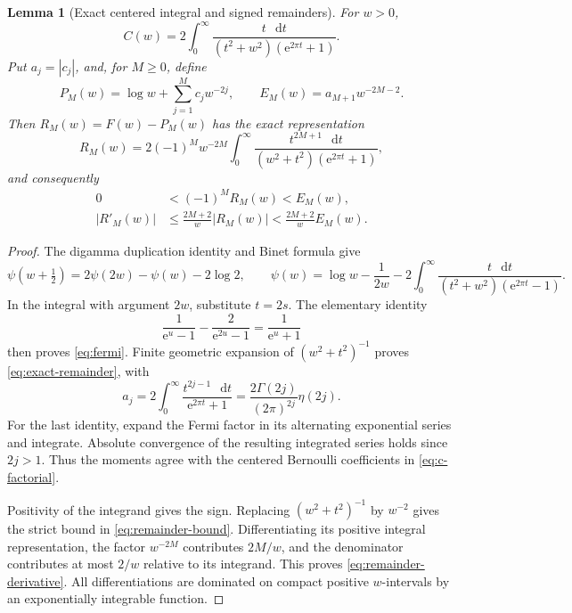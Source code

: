 \documentclass[11pt,a4paper]{article}
\newtheorem{lemma}[theorem]{Lemma}
\theoremstyle{definition}
\numberwithin{equation}{section}
\newcommand{\dd}{\mathop{}\!\mathrm{d}}
\newcommand{\ee}{\mathrm{e}}
\begin{document}
\begin{lemma}[Exact centered integral and signed remainders]
\label{lem:fermi}
For $w>0$,
\begin{equation}
 C(w)=2\int_0^\infty
       \frac{t\,\dd t}{(t^2+w^2)(\ee^{2\pi t}+1)}.
 \label{eq:fermi}
\end{equation}
Put $a_j=|c_j|$, and, for $M\ge0$, define
\begin{equation}
 P_M(w)=\log w+\sum_{j=1}^M c_jw^{-2j},\qquad
 E_M(w)=a_{M+1}w^{-2M-2}.
 \label{eq:PM}
\end{equation}
Then $R_M(w)=F(w)-P_M(w)$ has the exact representation
\begin{equation}
 R_M(w)=2(-1)^Mw^{-2M}
  \int_0^\infty\frac{t^{2M+1}\,\dd t}
       {(w^2+t^2)(\ee^{2\pi t}+1)},
 \label{eq:exact-remainder}
\end{equation}
and consequently
\begin{align}
 0&<(-1)^MR_M(w)<E_M(w),\label{eq:remainder-bound}\\
 |R'_M(w)|&\le\frac{2M+2}{w}|R_M(w)|
             <\frac{2M+2}{w}E_M(w).\label{eq:remainder-derivative}
\end{align}
\end{lemma}
\begin{proof}
The digamma duplication identity and Binet formula \cite[\S\S5.5, 5.9]{dlmf} give
\[
 \psi(w+\tfrac12)=2\psi(2w)-\psi(w)-2\log2,
 \qquad
 \psi(w)=\log w-\frac1{2w}
 -2\int_0^\infty\frac{t\,\dd t}{(t^2+w^2)(\ee^{2\pi t}-1)}.
\]
In the integral with argument $2w$, substitute $t=2s$. The elementary identity
\[
 \frac1{\ee^u-1}-\frac2{\ee^{2u}-1}=\frac1{\ee^u+1}
\]
then proves \eqref{eq:fermi}. Finite geometric expansion of $(w^2+t^2)^{-1}$ proves \eqref{eq:exact-remainder}, with
\begin{equation}
 a_j=2\int_0^\infty\frac{t^{2j-1}\,\dd t}{\ee^{2\pi t}+1}
     =\frac{2\Gamma(2j)}{(2\pi)^{2j}}\eta(2j).
 \label{eq:moment}
\end{equation}
For the last identity, expand the Fermi factor in its alternating exponential series and integrate. Absolute convergence of the resulting integrated series holds since $2j>1$. Thus the moments agree with the centered Bernoulli coefficients in \eqref{eq:c-factorial}.

Positivity of the integrand gives the sign. Replacing $(w^2+t^2)^{-1}$ by $w^{-2}$ gives the strict bound in \eqref{eq:remainder-bound}. Differentiating its positive integral representation, the factor $w^{-2M}$ contributes $2M/w$, and the denominator contributes at most $2/w$ relative to its integrand. This proves \eqref{eq:remainder-derivative}. All differentiations are dominated on compact positive $w$-intervals by an exponentially integrable function.
\end{proof}
\end{document}
